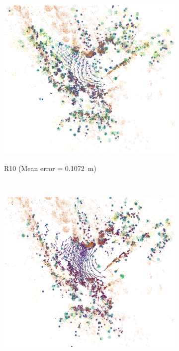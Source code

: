 \begin{figure}[tpbh!]
\begin{center}
\begin{subfigure}[b]{0.3\textwidth}
			\includegraphics[width=\linewidth]{figs/run10_init_fail/run_10.pdf}
			\label{fig:r10_pcl}
			\caption{R10 (Mean error = \SI{0.1072}{m})}
			\vspace{0.2in}
		\end{subfigure}%
		~
		\begin{subfigure}[b]{0.3\textwidth}
			\includegraphics[width=\linewidth]{figs/run10_init_fail/run_15.pdf}

\end{subfigure}
\end{center}
\end{figure}
